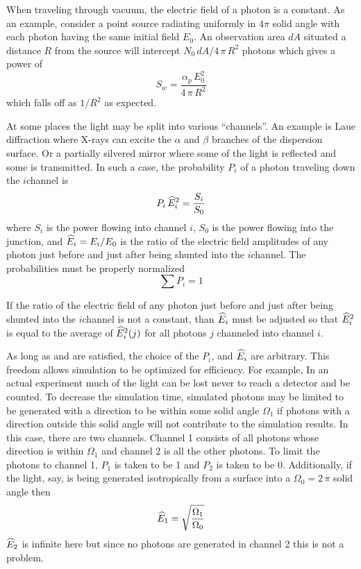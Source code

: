 When traveling through vacuum, the electric field of a photon is a
constant.  As an example, consider a point source radiating uniformly
in $4\pi$ solid angle with each photon having the same initial field
$E_0$. An observation area $dA$ situated a distance $R$ from the
source will intercept $N_0 \, dA / 4 \, \pi \, R^2$ photons which
gives a power of
\begin{equation}
  S_w = \frac{\alpha_p \, E_0^2}{4 \, \pi \, R^2}
\end{equation}
which falls off as $1/R^2$ as expected.

At some places the light may be split into various ``channels''. An
example is Laue diffraction where X-rays can excite the $\alpha$ and
$\beta$ branches of the dispersion surface. Or a partially silvered
mirror where some of the light is reflected and some is transmitted.
In such a case, the probability $P_i$ of a photon traveling down the
$i$\Th channel is
\begin{equation}
  P_i \, \widehat E_i^2 = \frac{S_i}{S_0}
  \label{rpss1}
\end{equation}
where $S_i$ is the power flowing into channel $i$, $S_0$ is the power
flowing into the junction, and $\widehat E_i = E_i / E_0$ is the ratio of
the electric field amplitudes of any photon just before and just after being
shunted into the $i$\Th channel. The probabilities must be properly
normalized
\begin{equation}
  \sum P_i = 1
  \label{p1}
\end{equation}

If the ratio of the electric field of any photon just before and just
after being shunted into the $i$\Th channel is not a constant, than
$\widehat E_i$ must be adjusted so that $\widehat E_i^2$ is equal to the average of
$\widehat E_i^2(j)$ for all photons $j$ channeled into channel $i$.

As long as  and  are satisfied, the choice of the
$P_i$, and $\widehat E_i$ are arbitrary. This freedom allows simulation to be
optimized for efficiency. For example, In an actual experiment much of
the light can be lost never to reach a detector and be counted. To
decrease the simulation time, simulated photons may be limited to be
generated with a direction to be within some solid angle $\Omega_1$ if
photons with a direction outside this solid angle will not contribute
to the simulation results. In this case, there are two channels.
Channel 1 consists of all photons whose direction is within
$\Omega_1$ and channel 2 is all the other photons. To limit the
photons to channel 1, $P_1$ is taken to be 1 and $P_2$ is taken to be
0. Additionally, if the light, say, is being generated isotropically
from a surface into a $\Omega_0 = 2 \, \pi$ solid angle then
\begin{equation}
  \widehat E_1 = \sqrt{\frac{\Omega_1}{\Omega_0}}
  \label{roo}
\end{equation}
$\widehat E_2$ is infinite here but since no photons are generated in channel 2
this is not a problem.

